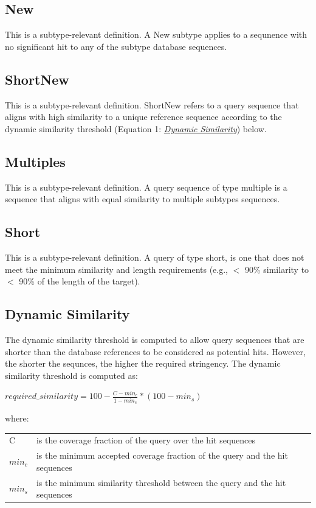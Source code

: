 \documentclass[letterpaper,10pt,english]{sphinxmanual}
\begin{document}
\subsection{New}
\label{defs:new}\label{defs:id4}
This is a subtype-relevant definition. A New subtype applies to a sequnence with no significant hit to any of the subtype database sequences.


\subsection{ShortNew}
\label{defs:id5}\label{defs:shortnew}
This is a subtype-relevant definition. ShortNew refers to a query sequence that aligns with high similarity to
a unique reference sequence according to the dynamic similarity
threshold (Equation 1: {\hyperref[defs:dynamic-similarity]{\emph{Dynamic Similarity}}}) below.


\subsection{Multiples}
\label{defs:id6}\label{defs:multiples}
This is a subtype-relevant definition. A query sequence of type multiple is a sequence that aligns with equal similarity to multiple subtypes sequences.


\subsection{Short}
\label{defs:id7}\label{defs:short}
This is a subtype-relevant definition. A query of type short, is one that does not meet the minimum
similarity and length requirements (e.g., \(<\) 90\% similarity to \(<\) 90\% of the length of the target).


\subsection{Dynamic Similarity}
\label{defs:dynamic-similarity}\label{defs:id8}
The dynamic similarity threshold is computed to allow query sequences
that are shorter than the database references to be considered as potential
hits. However, the shorter the sequnces, the higher the required stringency.
The dynamic similarity threshold is computed as:

\(required\_similarity = 100 - \frac{C - min_c}{1-min_c} * (100 - min_s)\)

where:

\begin{tabulary}{\linewidth}{|L|L|}
\hline

C
 & 
is the coverage fraction of the query over the hit sequences
\\

\(min_c\)
 & 
is the minimum accepted coverage fraction of the query and the hit sequences
\\

\(min_s\)
 & 
is the minimum similarity threshold between the query and the hit sequences
\\
\hline\end{tabulary}
\end{document}
